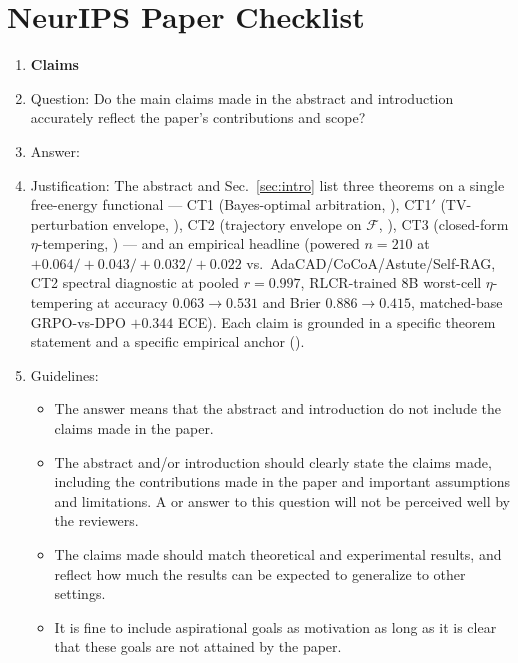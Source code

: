 \clearpage
\section*{NeurIPS Paper Checklist}
\label{app:checklist}

\begin{enumerate}

\item \textbf{Claims}
    \item[] Question: Do the main claims made in the abstract and introduction accurately reflect the paper's contributions and scope?
    \item[] Answer: \answerYes{}
    \item[] Justification: The abstract and Sec.~\ref{sec:intro} list three theorems on a single free-energy functional --- CT1 (Bayes-optimal arbitration, ), CT1$'$ (TV-perturbation envelope, ), CT2 (trajectory envelope on $\mathcal{F}$, ), CT3 (closed-form $\eta$-tempering, ) --- and an empirical headline (powered $n\!=\!210$ at $+0.064/+0.043/+0.032/+0.022$ vs.\ AdaCAD/CoCoA/Astute/Self-RAG, CT2 spectral diagnostic at pooled $r\!=\!0.997$, RLCR-trained $8$B worst-cell $\eta$-tempering at accuracy $0.063\!\to\!0.531$ and Brier $0.886\!\to\!0.415$, matched-base GRPO-vs-DPO $+0.344$ ECE). Each claim is grounded in a specific theorem statement and a specific empirical anchor ().
    \item[] Guidelines:
    \begin{itemize}
        \item The answer \answerNA{} means that the abstract and introduction do not include the claims made in the paper.
        \item The abstract and/or introduction should clearly state the claims made, including the contributions made in the paper and important assumptions and limitations. A \answerNo{} or \answerNA{} answer to this question will not be perceived well by the reviewers.
        \item The claims made should match theoretical and experimental results, and reflect how much the results can be expected to generalize to other settings.
        \item It is fine to include aspirational goals as motivation as long as it is clear that these goals are not attained by the paper.
    \end{itemize}


\end{enumerate}
